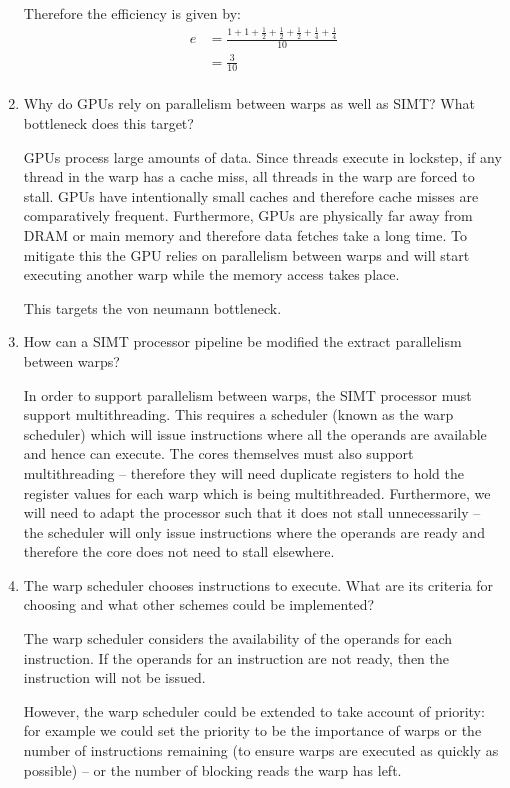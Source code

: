 \documentclass[10pt,\jkfside,a4paper]{article}
\begin{document}
\begin{enumerate}
Therefore the efficiency is given by:
\[
\begin{split}
e
&= \frac{1 + 1 + \frac{1}{2} + \frac{1}{2} + \frac{1}{2} + \frac{1}{4} +
\frac{1}{4}}{10} \\
&= \frac{3}{10} \\
\end{split}
\]

\item Why do GPUs rely on parallelism between warps as well as SIMT? What
bottleneck does this target?

GPUs process large amounts of data. Since threads execute in lockstep, if any
thread in the warp has a cache miss, all threads in the warp are forced
to stall. GPUs have intentionally small caches and therefore cache misses are
comparatively frequent. Furthermore, GPUs are physically far away from DRAM
or main memory and therefore data fetches take a long time. To mitigate this
the GPU relies on parallelism between warps and will start executing
another warp while the memory access takes place.

This targets the von neumann bottleneck.

\item How can a SIMT processor pipeline be modified the extract parallelism
between warps?

In order to support parallelism between warps, the SIMT processor must
support multithreading. This requires a scheduler (known as the warp
scheduler) which will issue instructions where all the operands are
available and hence can execute. The cores themselves must also support
multithreading -- therefore they will need duplicate registers to hold the
register values for each warp which is being multithreaded. Furthermore, we
will need to adapt the processor such that it does not stall unnecessarily
 -- the scheduler will only issue instructions where the operands are ready
and therefore the core does not need to stall elsewhere.

\item The warp scheduler chooses instructions to execute. What are its
criteria for choosing and what other schemes could be implemented?

The warp scheduler considers the availability of the operands for each
instruction. If the operands for an instruction are not ready, then the
instruction will not be issued.

However, the warp scheduler could be extended to take account of priority:
for example we could set the priority to be the importance of warps or
the number of instructions remaining (to ensure warps are executed as
quickly as possible) -- or the number of blocking reads the warp has left.

\end{enumerate}
\end{document}
